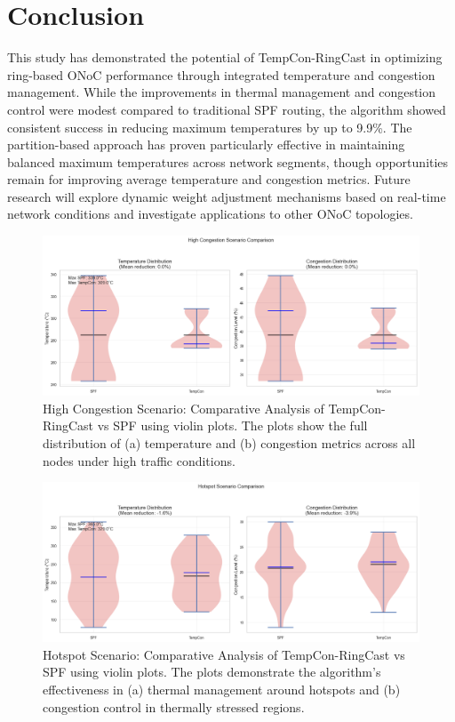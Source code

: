 \documentclass[conference]{IEEEtran}
\begin{document}
\section{Conclusion}
This study has demonstrated the potential of TempCon-RingCast in optimizing ring-based ONoC performance through integrated temperature and congestion management. While the improvements in thermal management and congestion control were modest compared to traditional SPF routing, the algorithm showed consistent success in reducing maximum temperatures by up to 9.9\%. The partition-based approach has proven particularly effective in maintaining balanced maximum temperatures across network segments, though opportunities remain for improving average temperature and congestion metrics. Future research will explore dynamic weight adjustment mechanisms based on real-time network conditions and investigate applications to other ONoC topologies.

\begin{figure}[h]
    \centering
    \includegraphics[width=\linewidth]{high_congestion_scenario_comparison.png}
    \caption{High Congestion Scenario: Comparative Analysis of TempCon-RingCast vs SPF using violin plots. The plots show the full distribution of (a) temperature and (b) congestion metrics across all nodes under high traffic conditions.}
    \label{fig:high_congestion}
\end{figure}

\begin{figure}[h]
    \centering
    \includegraphics[width=\linewidth]{hotspot_scenario_comparison.png}
    \caption{Hotspot Scenario: Comparative Analysis of TempCon-RingCast vs SPF using violin plots. The plots demonstrate the algorithm's effectiveness in (a) thermal management around hotspots and (b) congestion control in thermally stressed regions.}
    \label{fig:hotspot_scenario}
\end{figure}
\end{document}
